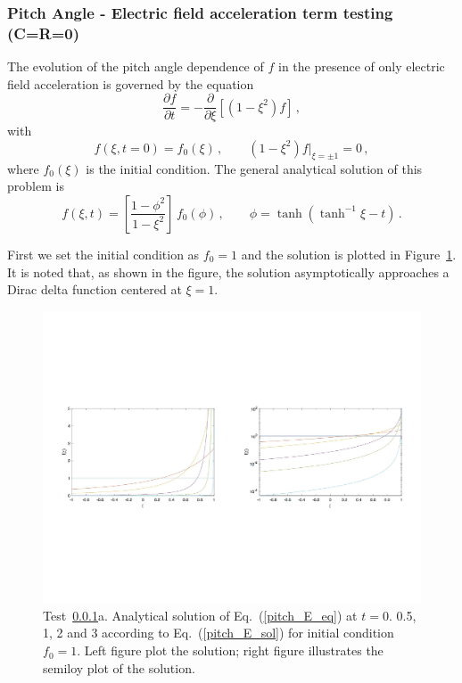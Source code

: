 \documentclass[preprint,11pt]{elsarticle}
\newcommand{\bq}{\begin{equation}}
\newcommand{\eq}{\end{equation}}
\begin{document}
\subsubsection{Pitch Angle - Electric field acceleration term testing (C=R=0)}
\label{Subsec:Pitch-1}
The evolution of the pitch angle dependence of $f$ in the presence of only electric field acceleration is governed by the equation
%
\bq
\label{pitch_E_eq}
\frac{\partial f}{\partial t}= - \frac{\partial}{\partial\xi} \left[ \left(1-\xi^2\right) f \right] \, ,
\eq
%
with
%
\bq
\label{ic_bc}
f(\xi, t=0)=f_0(\xi)\, , \qquad (1-\xi^2)f|_{\xi=\pm 1}=0 \, ,
\eq
%
where $f_0(\xi)$ is the initial condition. The general analytical solution of this problem is
%
\bq
\label{pitch_E_sol}
f(\xi,t)=\left[ \frac{1-\phi^2}{1-\xi^2}\right]\, f_0(\phi)\, , \qquad \phi=\tanh \left( \tanh^{-1} \xi -t \right) \, .
\eq

 First we set the initial condition as $f_0=1$ and the solution is plotted in Figure~\ref{Fig:Pitch_E_1}. 
It is noted that, as shown in the figure, the solution asymptotically approaches a Dirac delta function centered at $\xi=1$. 
%
\begin{figure}[H]
\centering
\includegraphics[scale=0.5]{FIGURES/fig_E_pitch}
\caption{Test~\ref{Subsec:Pitch-1}a. Analytical solution of Eq.~(\ref{pitch_E_eq}) at 
$t=0$. 0.5, 1, 2 and 3 according to Eq.~(\ref{pitch_E_sol}) for initial condition $f_0=1$. Left figure plot the solution; right figure illustrates the semiloy plot of the solution.}\label{Fig:Pitch_E_1}
\end{figure}
\end{document}
